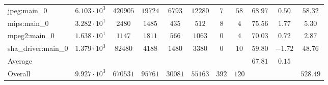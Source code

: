 \begin{tabular}{|l|c|c|c|c|c|c|c|c|c|c|}
jpeg:main\_0            & $ 6.103 \cdot 10^{3} $ & $ 420905 $ & $ 19724 $ & $ 6793  $ & $ 12280 $ & $ 7   $ & $ 58  $ & $ 68.97       $ & $ 0.50    $ & $ 58.32   $ \\
mips:main\_0            & $ 3.282 \cdot 10^{1} $ & $ 2480   $ & $ 1485  $ & $ 435   $ & $ 512   $ & $ 8   $ & $ 4   $ & $ 75.56       $ & $ 1.77    $ & $ 5.30    $ \\
mpeg2:main\_0           & $ 1.638 \cdot 10^{1} $ & $ 1147   $ & $ 1811  $ & $ 566   $ & $ 1063  $ & $ 0   $ & $ 4   $ & $ 70.03       $ & $ 0.72    $ & $ 2.87    $ \\
sha\_driver:main\_0     & $ 1.379 \cdot 10^{3} $ & $ 82480  $ & $ 4188  $ & $ 1480  $ & $ 3380  $ & $ 0   $ & $ 10  $ & $ 59.80       $ & $ -1.72   $ & $ 48.76   $ \\
\hline
Average                 & $                    $ & $        $ & $       $ & $       $ & $       $ & $     $ & $     $ & $ 67.81       $ & $ 0.15    $ & $         $ \\
\hline
Overall                 & $ 9.927 \cdot 10^{3} $ & $ 670531 $ & $ 95761 $ & $ 30081 $ & $ 55163 $ & $ 392 $ & $ 120 $ & $             $ & $         $ & $ 528.49  $ \\
\hline
\end{tabular}
